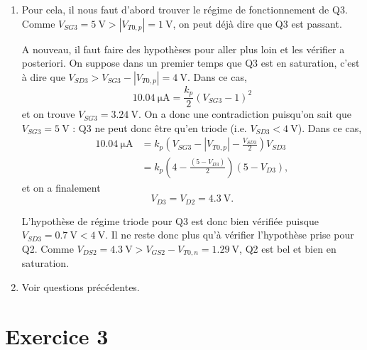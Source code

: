 \begin{enumerate}
	\item Pour cela, il nous faut d'abord trouver le régime de fonctionnement de Q3. Comme
	$V_{SG3} = \SI{5}{\volt} > |V_{T0,p}| = \SI{1}{\volt}$, on peut déjà dire que Q3 est passant.
	
	A nouveau, il faut faire des hypothèses pour aller plus loin et les vérifier a posteriori.
	On suppose dans un premier temps que Q3 est en saturation, c'est à dire que $V_{SD3} >
	V_{SG3} - |V_{T0,p}| = \SI{4}{\volt}$. Dans ce cas,
	\[ \SI{10.04}{\micro\ampere} = \frac{k_p}{2}(V_{SG3} - 1)^2 \]
	et on trouve $V_{SG3} = \SI{3.24}{\volt}$. On a donc une contradiction puisqu'on sait que
	$V_{SG3} = \SI{5}{\volt}$ : Q3 ne peut donc être qu'en triode (i.e. $V_{SD3} < \SI{4}{\volt}$).
	Dans ce cas,
	\begin{align*}
		\SI{10.04}{\micro\ampere} 	& = k_p(V_{SG3} - |V_{T0,p}| - \frac{V_{SD3}}{2})V_{SD3} \\
									& = k_p(4 - \frac{(5 - V_{D3})}{2})(5-V_{D3}),
	\end{align*}
	et on a finalement
	\[ V_{D3} = V_{D2} = \SI{4.3}{\volt}.\]
	
	L'hypothèse de régime triode pour Q3 est donc bien vérifiée puisque $V_{SD3} = \SI{0.7}{\volt} < 
	\SI{4}{\volt}$. Il ne reste donc plus qu'à vérifier l'hypothèse prise pour Q2. Comme
	$V_{DS2} = \SI{4.3}{\volt} > V_{GS2} - V_{T0,n} = \SI{1.29}{\volt}$, Q2 est bel et bien
	en saturation.
	
	\item Voir questions précédentes.
\end{enumerate}

\section{Exercice 3}

